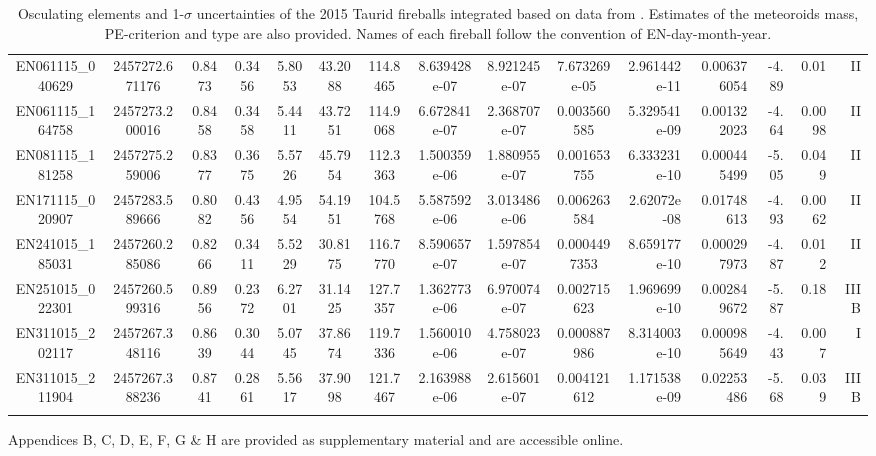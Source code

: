 \documentclass[letters,a4paper,fleqn,usenatbib]{mnras}
\begin{document}
\begin{table*}
{\begin{tabular}{ccccccccccrrrrr}
    EN061115\_040629 & 2457272.671176 & 0.8473 & 0.3456 & 5.8053 & 43.2088 & 114.8465 & 8.639428e-07 & 8.921245e-07 & 7.673269e-05 & 2.961442e-11 & 0.006376054 & -4.89 &    0.01     &  II \\
    EN061115\_164758 & 2457273.200016 & 0.8458 & 0.3458 & 5.4411 & 43.7251 & 114.9068 & 6.672841e-07 & 2.368707e-07 & 0.003560585  & 5.329541e-09 & 0.001322023 & -4.64  &   0.0098    & II \\
    EN081115\_181258 & 2457275.259006 & 0.8377 & 0.3675 & 5.5726 & 45.7954 & 112.3363 & 1.500359e-06 & 1.880955e-07 & 0.001653755  & 6.333231e-10 & 0.000445499 & -5.05   &  0.049  &    II \\
    EN171115\_020907 & 2457283.589666 & 0.8082 & 0.4356 & 4.9554 & 54.1951 & 104.5768 & 5.587592e-06 & 3.013486e-06 & 0.006263584  & 2.62072e-08  & 0.01748613 & -4.93  &   0.0062   &  II  \\
    EN241015\_185031 & 2457260.285086 & 0.8266 & 0.3411 & 5.5229 & 30.8175 & 116.7770 & 8.590657e-07 & 1.597854e-07 & 0.0004497353 & 8.659177e-10 & 0.000297973 & -4.87   &  0.012   &   II \\
    EN251015\_022301 & 2457260.599316 & 0.8956 & 0.2372 & 6.2701 & 31.1425 & 127.7357 & 1.362773e-06 & 6.970074e-07 & 0.002715623  & 1.969699e-10 & 0.002849672 & -5.87 &    0.18   &    IIIB\\
    EN311015\_202117 & 2457267.348116 & 0.8639 & 0.3044 & 5.0745 & 37.8674 & 119.7336 & 1.560010e-06  & 4.758023e-07 & 0.000887986  & 8.314003e-10 & 0.000985649  &-4.43 &    0.007  &    I  \\
    EN311015\_211904 & 2457267.388236 & 0.8741 & 0.2861 & 5.5617 & 37.9098 & 121.7467 & 2.163988e-06 & 2.615601e-07 & 0.004121612  & 1.171538e-09 & 0.02253486 & -5.68  &   0.039 &     IIIB     \\
    & & & & & & & & & & & & & &\\[-0.2cm]
    \hline  
    \hline
    \end{tabular}}
    \caption{Osculating elements and 1-$\sigma$ uncertainties of the 2015 Taurid fireballs integrated based on data from \citep{Spurny2017}. Estimates of the meteoroids mass, PE-criterion and type are also provided. Names of each fireball follow the convention of EN-day-month-year. }
    \label{tab:IC_fireballs}
\end{table*}


Appendices B, C, D, E, F, G \& H are provided as supplementary material and are accessible online. 

\bsp	%
\label{lastpage}
\end{document}
